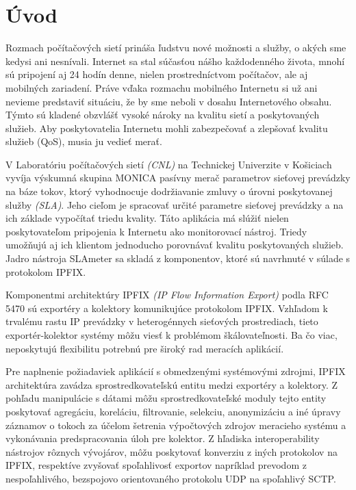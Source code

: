 \setcounter{page}{1}
\setcounter{equation}{0}
\setcounter{figure}{0}
\setcounter{table}{0}

\section*{\'Uvod}

Rozmach počítačových sietí prináša ľudstvu nové možnosti a služby, o akých sme kedysi ani nesnívali.
Internet sa stal súčasťou nášho každodenného života, mnohí sú pripojení aj 24 hodín denne, nielen 
prostredníctvom počítačov, ale aj mobilných zariadení. Práve vďaka rozmachu mobilného Internetu si už
ani nevieme predstaviť situáciu, že by sme neboli v dosahu Internetového obsahu. Týmto sú kladené 
obzvlášť vysoké nároky na kvalitu sietí a poskytovaných služieb. Aby poskytovatelia Internetu mohli 
zabezpečovať a zlepšovať kvalitu služieb (QoS), musia ju vedieť merať.

V Laboratóriu počítačových sietí \emph{(CNL)} na Technickej Univerzite v Košiciach vyvíja výskumná 
skupina MONICA pasívny merač parametrov sieťovej prevádzky na báze tokov, ktorý vyhodnocuje 
dodržiavanie zmluvy o úrovni poskytovanej služby \emph{(SLA)}. Jeho cieľom je spracovať určité parametre 
sieťovej prevádzky a na ich základe vypočítať triedu kvality. Táto aplikácia má slúžiť nielen poskytovateľom 
pripojenia k Internetu ako monitorovací nástroj. Triedy umožňujú aj ich klientom jednoducho 
porovnávať kvalitu poskytovaných služieb. Jadro nástroja SLAmeter sa skladá z komponentov, ktoré sú 
navrhnuté v súlade s protokolom IPFIX. \citep{slameter}

Komponentmi architektúry IPFIX \emph{(IP Flow Information Export)} podla RFC 5470 \citep{rfc5470}
sú exportéry a kolektory komunikujúce protokolom IPFIX. Vzhľadom k trvalému rastu IP prevádzky
v heterogénnych sieťových prostrediach, tieto exportér-kolektor systémy môžu viesť k problémom 
škálovateľnosti. Ba čo viac, neposkytujú flexibilitu potrebnú pre široký rad meracích aplikácií.

Pre naplnenie požiadaviek aplikácií s obmedzenými systémovými zdrojmi, IPFIX architektúra zavádza 
sprostredkovateľskú entitu medzi exportéry a kolektory. Z pohľadu manipulácie s dátami môžu sprostredkovateľské
moduly tejto entity poskytovať agregáciu, koreláciu, filtrovanie, selekciu, anonymizáciu a iné úpravy záznamov o 
tokoch za účelom 
šetrenia výpočtových zdrojov meracieho systému a vykonávania predspracovania úloh pre kolektor. Z hľadiska
interoperability nástrojov rôznych vývojárov, môžu poskytovať konverziu z iných protokolov na IPFIX, 
respektíve zvyšovať spoľahlivosť exportov napríklad prevodom z nespoľahlivého, bezspojovo orientovaného 
protokolu UDP na spoľahlivý SCTP. \citep{rfc6183}


